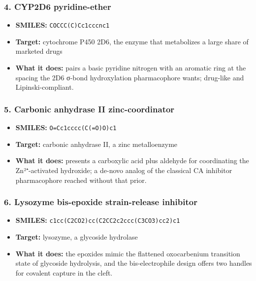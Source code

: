 \hypertarget{cyp2d6-pyridine-ether}{%
\subsubsection{4. CYP2D6 pyridine-ether}\label{cyp2d6-pyridine-ether}}

\begin{itemize}
\tightlist
\item
  \textbf{SMILES:} \texttt{COCCC(C)Cc1cccnc1}
\item
  \textbf{Target:} cytochrome P450 2D6, the enzyme that metabolizes a
  large share of marketed drugs
\item
  \textbf{What it does:} pairs a basic pyridine nitrogen with an
  aromatic ring at the spacing the 2D6 σ-bond hydroxylation
  pharmacophore wants; drug-like and Lipinski-compliant.
\end{itemize}

\hypertarget{carbonic-anhydrase-ii-zinc-coordinator}{%
\subsubsection{5. Carbonic anhydrase II
zinc-coordinator}\label{carbonic-anhydrase-ii-zinc-coordinator}}

\begin{itemize}
\tightlist
\item
  \textbf{SMILES:} \texttt{O=Cc1cccc(C(=O)O)c1}
\item
  \textbf{Target:} carbonic anhydrase II, a zinc metalloenzyme
\item
  \textbf{What it does:} presents a carboxylic acid plus aldehyde for
  coordinating the Zn²⁺-activated hydroxide; a de-novo analog of the
  classical CA inhibitor pharmacophore reached without that prior.
\end{itemize}

\hypertarget{lysozyme-bis-epoxide-strain-release-inhibitor}{%
\subsubsection{6. Lysozyme bis-epoxide strain-release
inhibitor}\label{lysozyme-bis-epoxide-strain-release-inhibitor}}

\begin{itemize}
\tightlist
\item
  \textbf{SMILES:} \texttt{c1cc(C2CO2)cc(C2CC2c2ccc(C3CO3)cc2)c1}
\item
  \textbf{Target:} lysozyme, a glycoside hydrolase
\item
  \textbf{What it does:} the epoxides mimic the flattened oxocarbenium
  transition state of glycoside hydrolysis, and the bis-electrophile
  design offers two handles for covalent capture in the cleft.
\end{itemize}

